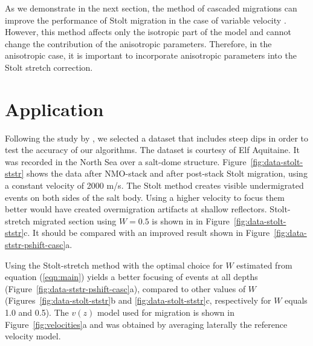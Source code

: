 As we demonstrate in the next section, the method of cascaded
migrations \cite[]{GEO52-05-06180643} can improve the performance of
Stolt migration in the case of variable velocity
\cite[]{GEO53-07-08810893}.  However, this method affects only the
isotropic part of the model and cannot change the contribution of the
anisotropic parameters.  Therefore, in the anisotropic case, it is
important to incorporate anisotropic parameters into the Stolt stretch
correction.

\section{Application}

Following the study by \cite{GEO54-06-07010717}, we selected a
dataset that includes steep dips in order to test the accuracy of our
algorithms. The dataset is courtesy of Elf Aquitaine.  It was recorded
in the North Sea over a salt-dome structure.
Figure~\ref{fig:data-stolt-ststr} shows the data after NMO-stack and
after post-stack Stolt migration, using a constant velocity of 2000
m/s. The Stolt method creates visible undermigrated events on both
sides of the salt body. Using a higher velocity to focus them better
would have created overmigration artifacts at shallow reflectors.
Stolt-stretch migrated section using $W=0.5$ is shown in in
Figure~\ref{fig:data-stolt-ststr}c. It should be compared with an
improved result shown in Figure~\ref{fig:data-ststr-pshift-casc}a.
\par
Using the Stolt-stretch method with the optimal choice for $W$
estimated from equation (\ref{eqn:main}) yields a better focusing of
events at all depths (Figure~\ref{fig:data-ststr-pshift-casc}a),
compared to other values of $W$ (Figures~\ref{fig:data-stolt-ststr}b
and \ref{fig:data-stolt-ststr}c, respectively for $W$ equals 1.0 and
0.5).  The $v(z)$ model used for migration is shown in
Figure~\ref{fig:velocities}a and was obtained by averaging laterally
the reference velocity model.




